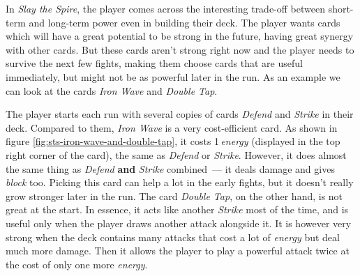 In \emph{Slay the Spire}, the player comes across the interesting trade-off between short-term and long-term power even in building their deck.
The player wants cards which will have a great potential to be strong in the future, having great synergy with other cards.
But these cards aren't strong right now and the player needs to survive the next few fights, making them choose cards that are useful immediately, but might not be as powerful later in the run.
As an example we can look at the cards \emph{Iron Wave} and \emph{Double Tap}.

The player starts each run with several copies of cards \emph{Defend} and \emph{Strike} in their deck.
Compared to them, \emph{Iron Wave} is a very cost-efficient card.
As shown in figure \ref{fig:sts-iron-wave-and-double-tap}, it costs 1\,\emph{energy} (displayed in the top right corner of the card), the same as \emph{Defend} or \emph{Strike}.
However, it does almost the same thing as \emph{Defend} \textbf{and} \emph{Strike} combined~--- it deals damage and gives \emph{block} too.
Picking this card can help a lot in the early fights, but it doesn't really grow stronger later in the run.
The card \emph{Double Tap}, on the other hand, is not great at the start.
In essence, it acts like another \emph{Strike} most of the time, and is useful only when the player draws another attack alongside it.
It is however very strong when the deck contains many attacks that cost a lot of \emph{energy} but deal much more damage.
Then it allows the player to play a powerful attack twice at the cost of only one more \emph{energy}.

